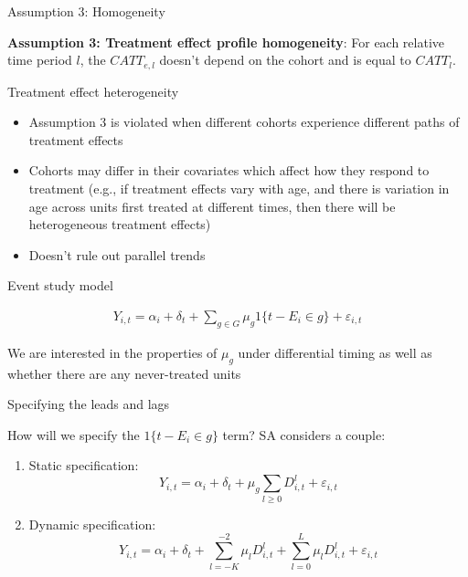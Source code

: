 \documentclass{beamer}
\begin{document}
\begin{frame}{Assumption 3: Homogeneity}

\textbf{Assumption 3: Treatment effect profile homogeneity}: For each relative time period $l$, the $CATT_{e,l}$ doesn't depend on the cohort and is equal to $CATT_l$. 


\end{frame}

\begin{frame}{Treatment effect heterogeneity}

\begin{itemize}
\item Assumption 3 is violated when different cohorts experience different paths of treatment effects
\item Cohorts may differ in their covariates which affect how they respond to treatment (e.g., if treatment effects vary with age, and there is variation in age across units first treated at different times, then there will be heterogeneous treatment effects)
\item Doesn't rule out parallel trends
\end{itemize}

\end{frame}

\begin{frame}{Event study model}

\begin{eqnarray*}
Y_{i,t} = \alpha_i + \delta_t + \sum_{g \in G} \mu_g1\{t-E_i \in g \} + \varepsilon_{i,t}
\end{eqnarray*}

\bigskip

We are interested in the properties of $\mu_g$ under differential timing as well as whether there are any never-treated units

\end{frame}


\begin{frame}{Specifying the leads and lags}

How will we specify the $1\{t-E_i \in g \} $ term?  SA considers a couple:

\begin{enumerate}
\item Static specification: $$Y_{i,t} = \alpha_i + \delta_t + \mu_g \sum_{l \geq 0}D^l_{i,t} + \varepsilon_{i,t}$$
\item Dynamic specification: $$Y_{i,t} = \alpha_i + \delta_t + \sum_{l = -K}^{-2} \mu_l D^l_{i,t} + \sum_{l=0}^L\mu_lD^l_{i,t}+ \varepsilon_{i,t}$$
\end{enumerate}

\end{frame}
\end{document}

